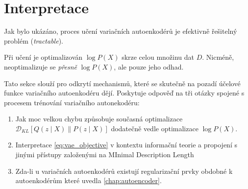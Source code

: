 \section{Interpretace}
Jak bylo ukázáno, proces učení variačních autoenkodérů je efektivně řešitelný problém (\emph{tractable}).

Při učení je optimalizován $\log P(X)$ skrze celou množinu dat $D$. Nicméně, neoptimalizuje se \emph{přesně} $\log P(X)$, ale pouze jeho odhad.

Tato sekce slouží pro odkrytí mechanismů, které se skutečně na pozadí účelové funkce variačního autoenkodéru dějí.
Poskytuje odpověď na tři otázky spojené s procesem trénování variačního autonekodéru:
\begin{enumerate}
    \item Jak moc velkou chybu způsobuje současná optimalizace $\mathcal{D}_{KL}\left[ Q(z\mid X) \parallel P(z\mid X) \right]$ dodatečně vedle optimalizace $\log P(X)$.
    \item Interpretace \autoref{eq:vae_objective} v kontextu informační teorie a propojení s jinými přístupy založenými na MInimal Description Length
    \item Zda-li u variačních autoenkodérů existují regularizační prvky obdobné k autoenkodérům které uvedla \autoref{chap:autoencoder}.
\end{enumerate}